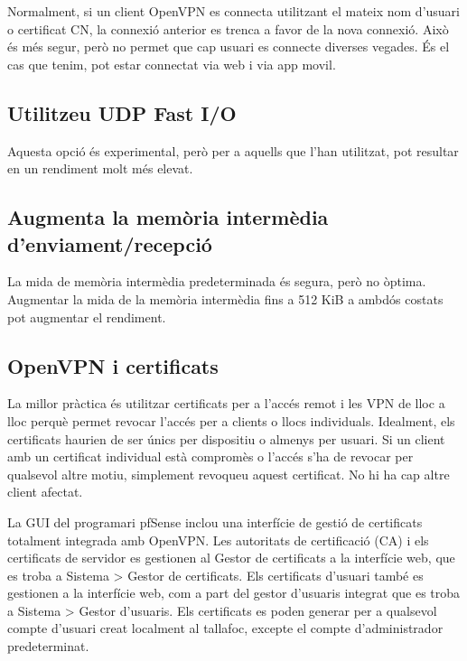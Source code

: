 \documentclass[
  10pt,
]{krantz}
\begin{document}
Normalment, si un client OpenVPN es connecta utilitzant el mateix nom d'usuari o certificat CN, la connexió anterior es trenca a favor de la nova connexió. Això és més segur, però no permet que cap usuari es connecte diverses vegades. És el cas que tenim, pot estar connectat via web i via app movil.

\hypertarget{utilitzeu-udp-fast-io}{%
\subsection{Utilitzeu UDP Fast I/O}\label{utilitzeu-udp-fast-io}}

Aquesta opció és experimental, però per a aquells que l'han utilitzat, pot resultar en un rendiment molt més elevat.

\hypertarget{augmenta-la-memuxf2ria-intermuxe8dia-denviamentrecepciuxf3}{%
\subsection{Augmenta la memòria intermèdia d'enviament/recepció}\label{augmenta-la-memuxf2ria-intermuxe8dia-denviamentrecepciuxf3}}

La mida de memòria intermèdia predeterminada és segura, però no òptima. Augmentar la mida de la memòria intermèdia fins a 512 KiB a ambdós costats pot augmentar el rendiment.

\hypertarget{openvpn-i-certificats}{%
\subsection{OpenVPN i certificats}\label{openvpn-i-certificats}}

La millor pràctica és utilitzar certificats per a l'accés remot i les VPN de lloc a lloc perquè permet revocar l'accés per a clients o llocs individuals. Idealment, els certificats haurien de ser únics per dispositiu o almenys per usuari. Si un client amb un certificat individual està compromès o l'accés s'ha de revocar per qualsevol altre motiu, simplement revoqueu aquest certificat. No hi ha cap altre client afectat.

La GUI del programari pfSense inclou una interfície de gestió de certificats totalment integrada amb OpenVPN. Les autoritats de certificació (CA) i els certificats de servidor es gestionen al Gestor de certificats a la interfície web, que es troba a Sistema \textgreater{} Gestor de certificats. Els certificats d'usuari també es gestionen a la interfície web, com a part del gestor d'usuaris integrat que es troba a Sistema \textgreater{} Gestor d'usuaris. Els certificats es poden generar per a qualsevol compte d'usuari creat localment al tallafoc, excepte el compte d'administrador predeterminat.
\end{document}

